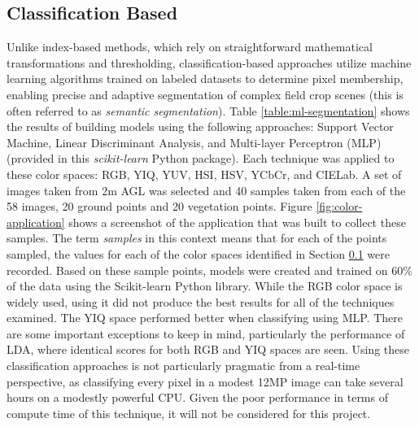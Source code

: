 \documentclass[letterpaper]{report}
\begin{document}
{%
%


\subsection{Classification Based}
\label{section:classification}
Unlike index-based methods, which rely on straightforward mathematical transformations and thresholding, classification-based approaches utilize machine learning algorithms trained on labeled datasets to determine pixel membership, enabling precise and adaptive segmentation of complex field crop scenes (this is often referred to as \textit{semantic segmentation}). Table \ref{table:ml-segmentation} shows the results of building models using the following approaches:  Support Vector Machine, Linear Discriminant Analysis, and Multi-layer Perceptron (MLP) (provided in this \textit{scikit-learn} Python package). Each technique was applied to these color spaces: RGB, YIQ, YUV, HSI, HSV, YCbCr, and CIELab. A set of images taken from 2m AGL was selected and 40 samples taken from each of the 58 images, 20 ground points and 20 vegetation points. Figure \ref{fig:color-application} shows a screenshot of the application that was built to collect these samples. The term \textit{samples} in this context means that for each of the points sampled, the values for each of the color spaces identified in Section \ref{section:classification} were recorded. Based on these sample points, models were created and trained on 60\% of the data using the Scikit-learn Python library. While the RGB color space is widely used, using it did not produce the best results for all of the techniques examined. The YIQ space performed better when classifying using MLP. There are some important exceptions to keep in mind, particularly the performance of LDA, where identical scores for both RGB and YIQ spaces are seen. Using these classification approaches is not particularly pragmatic from a real-time perspective, as classifying every pixel in a modest 12MP image can take several hours on a modestly powerful CPU. Given the poor performance in terms of compute time of this technique, it will not be considered for this project.

}
\end{document}
